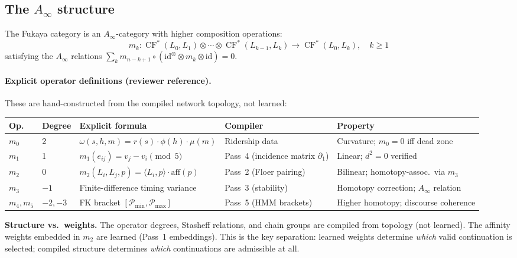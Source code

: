 \documentclass[11pt,a4paper]{article}
\DeclareMathOperator{\CF}{CF}
\begin{document}
\subsection{The $A_\infty$ structure}

The Fukaya category is an $A_\infty$-category with higher
composition operations:
\[
  m_k : \CF^*(L_0,L_1) \otimes \cdots \otimes
        \CF^*(L_{k-1},L_k) \to \CF^*(L_0,L_k), \quad k \geq 1
\]
satisfying the $A_\infty$ relations
$\sum_{k} m_{n-k+1}\circ(\mathrm{id}^{\otimes}\otimes m_k \otimes
\mathrm{id}) = 0$.

\paragraph{Explicit operator definitions (reviewer reference).}
These are hand-constructed from the compiled network topology, not learned:

\begin{center}
\renewcommand{\arraystretch}{1.25}\small
\begin{tabularx}{\linewidth}{p{0.8cm}p{1.4cm}p{3.5cm}p{2.4cm}X}
\toprule
\textbf{Op.} & \textbf{Degree} & \textbf{Explicit formula} &
\textbf{Compiler} & \textbf{Property} \\
\midrule
$m_0$ & 2 &
  $\omega(s,h,m) = r(s)\cdot\phi(h)\cdot\mu(m)$ &
  Ridership data &
  Curvature; $m_0=0$ iff dead zone \\
$m_1$ & 1 &
  $m_1(e_{ij}) = v_j - v_i \pmod{5}$ &
  Pass~4 (incidence matrix $\partial_1$) &
  Linear; $d^2=0$ verified \\
$m_2$ & 0 &
  $m_2(L_i,L_j,p) = \langle L_i,p\rangle\cdot\mathrm{aff}(p)$ &
  Pass~2 (Floer pairing) &
  Bilinear; homotopy-assoc.\ via $m_3$ \\
$m_3$ & $-1$ &
  Finite-difference timing variance &
  Pass~3 (stability) &
  Homotopy correction; $A_\infty$ relation \\
$m_4,m_5$ & $-2,-3$ &
  FK bracket $[\mathcal{P}_\mathrm{min},\mathcal{P}_\mathrm{max}]$ &
  Pass~5 (HMM brackets) &
  Higher homotopy; discourse coherence \\
\bottomrule
\end{tabularx}
\end{center}

\noindent
\textbf{Structure vs.\ weights.} The operator degrees, Stasheff relations,
and chain groups are compiled from topology (not learned).
The affinity weights embedded in $m_2$ are learned (Pass~1 embeddings).
This is the key separation: learned weights determine \emph{which}
valid continuation is selected; compiled structure determines \emph{which}
continuations are admissible at all.
\end{document}
